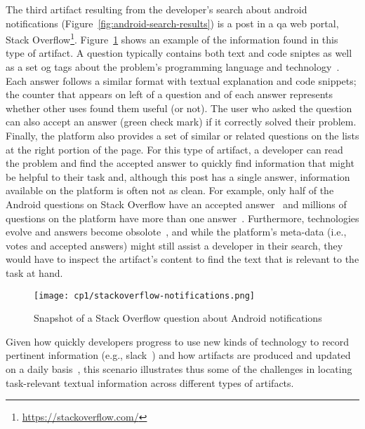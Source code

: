 The third artifact resulting from the developer's search 
about android notifications (Figure~\ref{fig:android-search-results})
is a post in a \acf{qa} web portal, Stack Overflow\footnote{\url{https://stackoverflow.com/}}.
Figure~\ref{fig:qa-notification-icon} shows an example of the information found in this type of artifact.
A question typically contains both text and code sniptes
as well as a set og tags  about the
problem's programming language and technology~\cite{Treude2011a}. 
Each answer follows a similar format with textual explanation and code snippets; 
the counter that appears on left of a question and of each answer
represents whether other uses found them useful (or not).
The user who asked the question can also accept an answer (green check mark)
if it correctly solved their problem.
Finally, the platform also provides a set of similar or related questions on the lists 
at the right portion of the page. 
For this type of artifact, a developer can read the problem and 
find the accepted answer to quickly find information that might be helpful 
to their task and, although this post has a single answer,
information available on the platform is often not as clean. 
For example, only half of the Android questions on Stack Overflow
have an accepted answer~\cite{parnin2012} 
and millions of questions on the platform have more than one answer~\cite{nadi2020}.
Furthermore, technologies evolve and answers become obsolote~\cite{Allamanis2013}, 
and while the platform's 
meta-data (i.e., votes and accepted answers) might still assist a developer
in their search, they would have to inspect the artifact's content to find 
the text that is relevant to the task at hand. 




\begin{figure}
    \centering
    \texttt{[image: cp1/stackoverflow-notifications.png]}
    \caption{Snapshot of a Stack Overflow question about Android notifications}
    \label{fig:qa-notification-icon}
\end{figure}



        
 

Given how quickly developers progress to use new kinds of technology to
record pertinent information (e.g., slack~\cite{Storey2017, Lin2016})
and how artifacts are produced and updated on a daily basis~\cite{watson2022, Rastkar2013t}, 
this scenario illustrates thus some of the challenges in locating task-relevant textual
 information across different types of artifacts.



